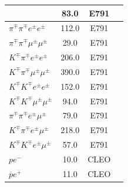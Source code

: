 \begin{longtable}{l|ccc}
& 83.0 & E791 & \cite{Aitala:2000kk}\\
\hline
$\pi{}^{\mp}\pi{}^{\mp}e^{\pm}e^{\pm}$ & 112.0 & E791 & \cite{Aitala:2000kk}\\
\hline
$\pi{}^{\mp}\pi{}^{\mp}\mu{}^{\pm}\mu{}^{\pm}$ & 29.0 & E791 & \cite{Aitala:2000kk}\\
\hline
$K^{\mp}\pi{}^{\mp}e^{\pm}e^{\pm}$ & 206.0 & E791 & \cite{Aitala:2000kk}\\
\hline
$K^{\mp}\pi{}^{\mp}\mu{}^{\pm}\mu{}^{\pm}$ & 390.0 & E791 & \cite{Aitala:2000kk}\\
\hline
$K^{\mp}K^{\mp}e^{\pm}e^{\pm}$ & 152.0 & E791 & \cite{Aitala:2000kk}\\
\hline
$K^{\mp}K^{\mp}\mu{}^{\pm}\mu{}^{\pm}$ & 94.0 & E791 & \cite{Aitala:2000kk}\\
\hline
$\pi{}^{\mp}\pi{}^{\mp}e^{\pm}\mu{}^{\pm}$ & 79.0 & E791 & \cite{Aitala:2000kk}\\
\hline
$K^{\mp}\pi{}^{\mp}e^{\pm}\mu{}^{\pm}$ & 218.0 & E791 & \cite{Aitala:2000kk}\\
\hline
$K^{\mp}K^{\mp}e^{\pm}\mu{}^{\pm}$ & 57.0 & E791 & \cite{Aitala:2000kk}\\
\hline
$pe^-$ & 10.0 & CLEO & \cite{Rubin:2009aa}\\
\hline
$\overline{p}e^+$ & 11.0 & CLEO & \cite{Rubin:2009aa}\\
\hline
\end{longtable}

\pagebreak

